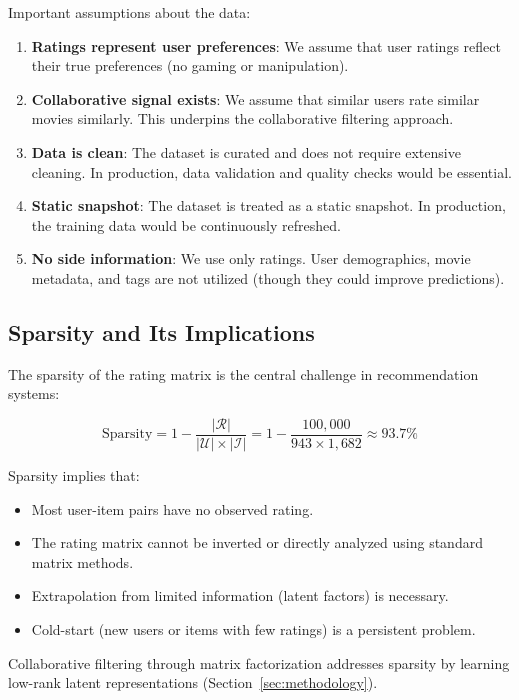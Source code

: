 Important assumptions about the data:

\begin{enumerate}
  \item \textbf{Ratings represent user preferences}: We assume that user ratings reflect their true preferences 
  (no gaming or manipulation).
  
  \item \textbf{Collaborative signal exists}: We assume that similar users rate similar movies similarly. 
  This underpins the collaborative filtering approach.
  
  \item \textbf{Data is clean}: The dataset is curated and does not require extensive cleaning. In production, 
  data validation and quality checks would be essential.
  
  \item \textbf{Static snapshot}: The dataset is treated as a static snapshot. In production, the training 
  data would be continuously refreshed.
  
  \item \textbf{No side information}: We use only ratings. User demographics, movie metadata, and tags are 
  not utilized (though they could improve predictions).
\end{enumerate}

\subsection{Sparsity and Its Implications}

The sparsity of the rating matrix is the central challenge in recommendation systems:

\[
  \text{Sparsity} = 1 - \frac{|\mathcal{R}|}{|\mathcal{U}| \times |\mathcal{I}|} = 1 - \frac{100,000}{943 \times 1,682} \approx 93.7\%
\]

Sparsity implies that:
\begin{itemize}
  \item Most user-item pairs have no observed rating.
  \item The rating matrix cannot be inverted or directly analyzed using standard matrix methods.
  \item Extrapolation from limited information (latent factors) is necessary.
  \item Cold-start (new users or items with few ratings) is a persistent problem.
\end{itemize}

Collaborative filtering through matrix factorization addresses sparsity by learning low-rank latent 
representations (Section~\ref{sec:methodology}).
